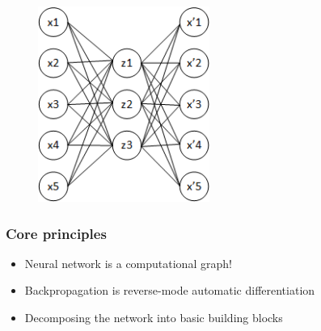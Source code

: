 \documentclass{beamer}
\begin{document}
\begin{frame}
\begin{figure}[h!]
	\centering
	\includegraphics[width=0.5\textwidth]{autoencoder_bad_diagram.png}
\end{figure}

\end{frame}
\begin{frame}
	\frametitle{Core principles}
	\begin{itemize}
		\item Neural network is a computational graph!
		\item Backpropagation is reverse-mode automatic differentiation
		\item Decomposing the network into basic building blocks
	\end{itemize}
\end{frame}
\end{document}
